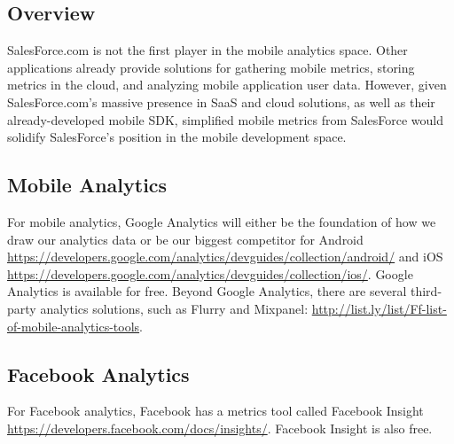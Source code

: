 \documentclass[12pt,oneside,letterpaper]{article}
\begin{document}
\subsection{Overview}

SalesForce.com is not the first player in the mobile analytics space. Other applications already provide solutions for gathering mobile metrics, storing metrics in the cloud, and analyzing mobile application user data. However, given SalesForce.com's massive presence in SaaS and cloud solutions, as well as their already-developed mobile SDK, simplified mobile metrics from SalesForce would solidify SalesForce's position in the mobile development space.
\subsection{Mobile Analytics}
For mobile analytics, Google Analytics will either be the foundation of how we draw our analytics data or be our biggest competitor for Android
\url{https://developers.google.com/analytics/devguides/collection/android/} and iOS \url{https://developers.google.com/analytics/devguides/collection/ios/}.  Google Analytics is available for free. Beyond Google Analytics, there are several third-party analytics solutions, such as Flurry and Mixpanel: \url{http://list.ly/list/Ff-list-of-mobile-analytics-tools}.
\subsection{Facebook Analytics}
For Facebook analytics, Facebook has a metrics tool called Facebook Insight \url{https://developers.facebook.com/docs/insights/}.  Facebook Insight is also free.
\end{document}
